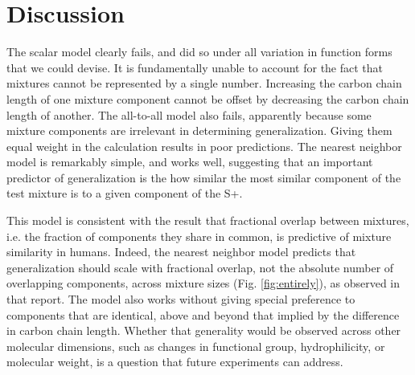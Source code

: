 \section{Discussion}

The scalar model clearly fails, and did so under all variation in function forms that we could devise.  It is fundamentally unable to account for the fact that mixtures cannot be represented by a single number.  Increasing the carbon chain length of one mixture component cannot be offset by decreasing the carbon chain length of another.  The all-to-all model also fails, apparently because some mixture components are irrelevant in determining generalization.  Giving them equal weight in the calculation results in poor predictions.  The nearest neighbor model is remarkably simple, and works well, suggesting that an important predictor of generalization is the how similar the most similar component of the test mixture is to a given component of the S+.  

This model is consistent with the result that fractional overlap between mixtures, i.e. the fraction of components they share in common, is predictive of mixture similarity in humans\cite{24653035}.  Indeed, the nearest neighbor model predicts that generalization should scale with fractional overlap, not the absolute number of overlapping components, across mixture sizes (Fig. \ref{fig:entirely}), as observed in that report.  The model also works without giving special preference to components that are identical, above and beyond that implied by the difference in carbon chain length.  Whether that generality would be observed across other molecular dimensions, such as changes in functional group, hydrophilicity, or molecular weight, is a question that future experiments can address.   